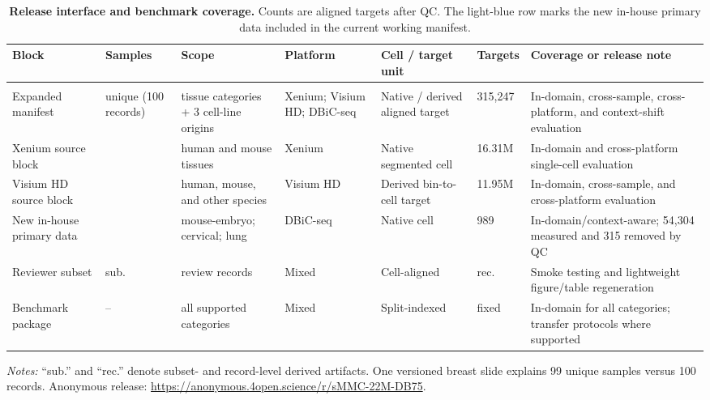\documentclass[sigconf,review]{acmart}
\begin{document}
\begin{table}[!t]
\centering
\footnotesize
\setlength{\tabcolsep}{2.4pt}
\renewcommand{\arraystretch}{1.04}
\setlength{\abovecaptionskip}{4pt}
\setlength{\belowcaptionskip}{3pt}

\caption{\textbf{Release interface and benchmark coverage.}
Counts are aligned targets after QC. The light-blue row marks the new in-house
primary data included in the current working manifest.}
\label{tab:main_release_manifest}

\begin{tabularx}{\textwidth}{
>{\raggedright\arraybackslash}p{2.25cm}
>{\raggedright\arraybackslash}p{1.35cm}
>{\raggedright\arraybackslash}p{2.15cm}
>{\raggedright\arraybackslash}p{1.65cm}
>{\raggedright\arraybackslash}p{1.75cm}
>{\raggedleft\arraybackslash}p{1.45cm}
>{\raggedright\arraybackslash}X
}
\toprule
\textbf{Block} &
\textbf{Samples} &
\textbf{Scope} &
\textbf{Platform} &
\textbf{Cell / target unit} &
\textbf{Targets} &
\textbf{Coverage or release note} \\
\midrule
\rowcolor{gray!12}
\multicolumn{7}{l}{\textit{Release interface and benchmark coverage}} \\
Expanded manifest &
99 unique (100 records) &
25 tissue categories + 3 cell-line origins &
Xenium; Visium HD; DBiC-seq &
Native / derived aligned target &
28{,}315{,}247 &
In-domain, cross-sample, cross-platform, and context-shift evaluation \\
Xenium source block &
42 &
human and mouse tissues &
Xenium &
Native segmented cell &
16.31M &
In-domain and cross-platform single-cell evaluation \\
Visium HD source block &
36 &
human, mouse, and other species &
Visium HD &
Derived bin-to-cell target &
11.95M &
In-domain, cross-sample, and cross-platform evaluation \\
\rowcolor{inhouseblue}
New in-house primary data &
21 &
mouse-embryo; cervical; lung &
DBiC-seq &
Native cell &
53{,}989 &
In-domain/context-aware; 54{,}304 measured and 315 removed by QC \\
Reviewer subset &
sub. &
review records &
Mixed &
Cell-aligned &
rec. &
Smoke testing and lightweight figure/table regeneration \\
Benchmark package &
-- &
all supported categories &
Mixed &
Split-indexed &
fixed &
In-domain for all categories; transfer protocols where supported \\
\bottomrule
\end{tabularx}

\vspace{1pt}
{\scriptsize\emph{Notes:} ``sub.'' and ``rec.'' denote subset- and
record-level derived artifacts. One versioned breast slide explains 99 unique
samples versus 100 records. Anonymous release:
\url{https://anonymous.4open.science/r/sMMC-22M-DB75}.}
\end{table}
\end{document}
